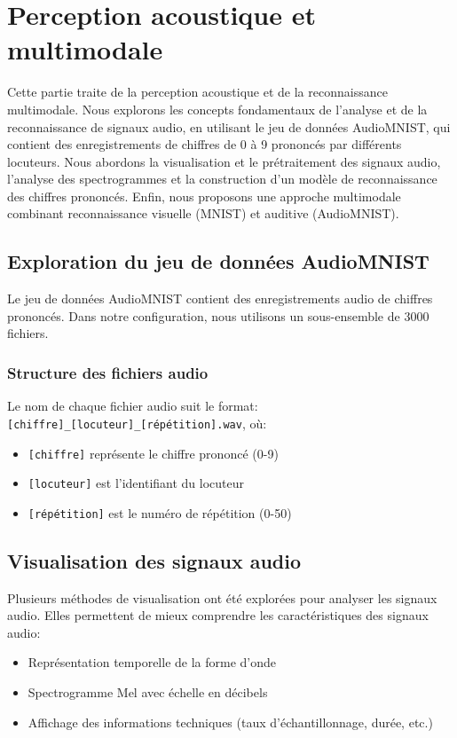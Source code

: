 \section{Perception acoustique et multimodale}

Cette partie traite de la perception acoustique et de la reconnaissance multimodale. Nous explorons les concepts fondamentaux de l'analyse et de la reconnaissance de signaux audio, en utilisant le jeu de données AudioMNIST, qui contient des enregistrements de chiffres de 0 à 9 prononcés par différents locuteurs. Nous abordons la visualisation et le prétraitement des signaux audio, l'analyse des spectrogrammes et la construction d'un modèle de reconnaissance des chiffres prononcés. Enfin, nous proposons une approche multimodale combinant reconnaissance visuelle (MNIST) et auditive (AudioMNIST).

\subsection{Exploration du jeu de données AudioMNIST}
\label{subsec:exploration}

Le jeu de données AudioMNIST contient des enregistrements audio de chiffres prononcés. Dans notre configuration, nous utilisons un sous-ensemble de 3000 fichiers.

\subsubsection{Structure des fichiers audio}
\label{subsubsec:structure}

Le nom de chaque fichier audio suit le format: \texttt{[chiffre]\_[locuteur]\_[répétition].wav}, où:
\begin{itemize}
    \item \texttt{[chiffre]} représente le chiffre prononcé (0-9)
    \item \texttt{[locuteur]} est l'identifiant du locuteur
    \item \texttt{[répétition]} est le numéro de répétition (0-50)
\end{itemize}
\newpage
\subsection{Visualisation des signaux audio}
\label{sec:visualisation}

Plusieurs méthodes de visualisation ont été explorées pour analyser les signaux audio.
Elles permettent de mieux comprendre les caractéristiques des signaux audio:
\begin{itemize}
    \item Représentation temporelle de la forme d'onde
    \item Spectrogramme Mel avec échelle en décibels
    \item Affichage des informations techniques (taux d'échantillonnage, durée, etc.)
\end{itemize}

